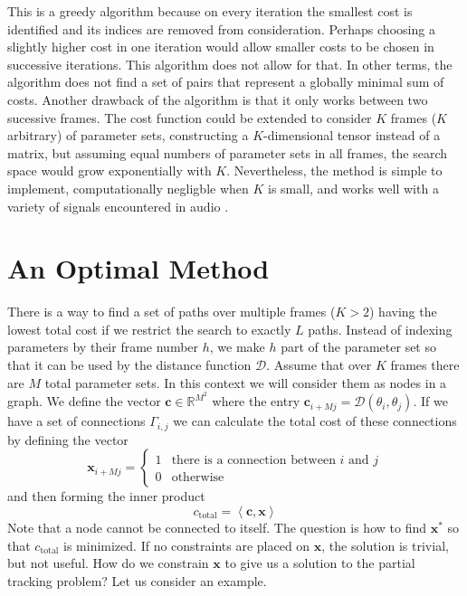 This is a greedy algorithm because on every iteration the smallest cost is
identified and its indices are removed from consideration. Perhaps choosing a
slightly higher cost in one iteration would allow smaller costs to be chosen in
successive iterations. This algorithm does not allow for that. In other terms,
the algorithm does not find a set of pairs that represent a globally minimal sum of
costs.
Another drawback of the algorithm is that it only works between two sucessive
frames. The cost function could be extended to consider $K$ frames ($K$
arbitrary) of parameter sets, constructing a $K$-dimensional tensor instead of a
matrix, but assuming equal numbers of parameter sets in all frames, the search
space would grow exponentially with $K$. Nevertheless, the method is simple to
implement, computationally negligble when $K$ is small, and works well with a
variety of signals encountered in audio \cite{mcaulay1986speech}
\cite{smith1987parshl}.

\section{An Optimal Method \label{sec:lppathsearch}}

There is a way to find a set of paths over multiple frames ($K > 2$) having the
lowest total cost if
we restrict the search to exactly $L$ paths. Instead of indexing parameters by
their frame number $h$, we make $h$ part of the parameter set so that it can be
used by the distance function $\mathcal{D}$. Assume that over $K$ frames there
are $M$ total parameter sets. In this context we will consider them as nodes in
a graph. We define the vector $\boldsymbol{c} \in \mathbb{R}^{M^2}$
where the entry $\boldsymbol{c}_{i + Mj} = \mathcal{D} \left( \theta_{i}, \theta_{j}
\right)$. If we have a set of connections $\Gamma_{i,j}$ we can calculate the
total cost of these connections by defining the vector
\[
    \boldsymbol{x}_{i + Mj} = \begin{cases}
        1 & \text{there is a connection between }i\text{ and }j\\
        0 & \text{otherwise}
    \end{cases}
\]
and then forming the inner product
\[
    c_{\text{total}}=\left\langle \boldsymbol{c},\boldsymbol{x} \right\rangle
\]
Note that a node cannot be connected to itself. The question is how to find
$\boldsymbol{x}^{\ast}$ so that $c_{\text{total}}$ is minimized. If no
constraints are placed on $\boldsymbol{x}$, the solution is trivial, but not
useful. How do we constrain $\boldsymbol{x}$ to give us a solution to the
partial tracking problem? Let us consider an example.

